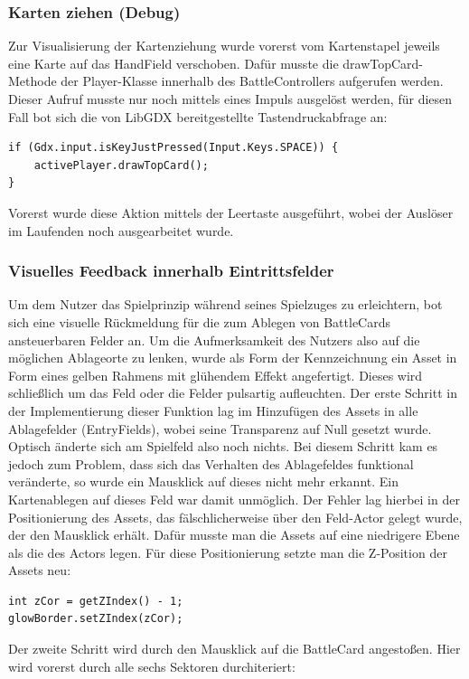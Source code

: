 \subsubsection{Karten ziehen (Debug)}
Zur Visualisierung der Kartenziehung wurde vorerst vom Kartenstapel jeweils eine Karte auf das HandField verschoben.
Dafür musste die drawTopCard-Methode der Player-Klasse innerhalb des BattleControllers aufgerufen werden.
Dieser Aufruf musste nur noch mittels eines Impuls ausgelöst werden, für diesen Fall bot sich die von LibGDX bereitgestellte Tastendruckabfrage an:
\begin{lstlisting}
if (Gdx.input.isKeyJustPressed(Input.Keys.SPACE)) {
	activePlayer.drawTopCard();
}
\end{lstlisting}
Vorerst wurde diese Aktion mittels der Leertaste ausgeführt, wobei der Auslöser im Laufenden noch ausgearbeitet wurde.

\subsubsection{Visuelles Feedback innerhalb Eintrittsfelder}
Um dem Nutzer das Spielprinzip während seines Spielzuges zu erleichtern, bot sich eine visuelle Rückmeldung für die zum Ablegen von BattleCards ansteuerbaren Felder an. Um die Aufmerksamkeit des Nutzers also auf die möglichen Ablageorte zu lenken, wurde als Form der Kennzeichnung ein Asset in Form eines gelben Rahmens mit glühendem Effekt angefertigt. Dieses wird schließlich um das Feld oder die Felder pulsartig aufleuchten.
Der erste Schritt in der Implementierung dieser Funktion lag im Hinzufügen des Assets in alle Ablagefelder (EntryFields), wobei seine Transparenz auf Null gesetzt wurde. Optisch änderte sich am Spielfeld also noch nichts.
Bei diesem Schritt kam es jedoch zum Problem, dass sich das Verhalten des Ablagefeldes funktional veränderte, so wurde ein Mausklick auf dieses nicht mehr erkannt. Ein Kartenablegen auf dieses Feld war damit unmöglich.
Der Fehler lag hierbei in der Positionierung des Assets, das fälschlicherweise über den Feld-Actor gelegt wurde, der den Mausklick erhält. Dafür musste man die Assets auf eine niedrigere Ebene als die des Actors legen. Für diese Positionierung setzte man die Z-Position der Assets neu:
\begin{lstlisting}
int zCor = getZIndex() - 1;
glowBorder.setZIndex(zCor);
\end{lstlisting}

Der zweite Schritt wird durch den Mausklick auf die BattleCard angestoßen. Hier wird vorerst durch alle sechs Sektoren durchiteriert:

